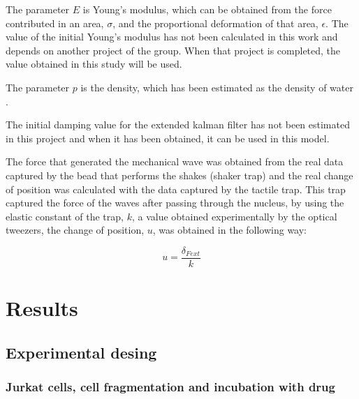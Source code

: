 \documentclass[12pt, a4paper]{article} %
\begin{document}
The parameter $E$ is Young's modulus, which can be obtained from the force contributed in an area, $\sigma$, and the proportional deformation of that area, $\epsilon$. The value of the initial Young's modulus has not been calculated in this work and depends on another project of the group. When that project is completed, the value obtained in this study will be used.

The parameter $p$ is the density, which has been estimated as the density of water \cite{patterson1994measurement}. 

The initial damping value for the extended kalman filter has not been estimated in this project and when it has been obtained, it can be used in this model.

The force that generated the mechanical wave was obtained from the real data captured by the bead that performs the shakes (shaker trap) and the real change of position was calculated with the data captured by the tactile trap. This trap captured the force of the waves after passing through the nucleus, by using the elastic constant of the trap, $k$, a value obtained experimentally by the optical tweezers, the change of position, $u$, was obtained in the following way:

\begin{equation} \label{eqn:real_desp}
	u = \frac{\delta_{Fext}}{k}
\end{equation}

\newpage


\section{Results}

\setlength{\parskip}{0mm}

\subsection{Experimental desing}

\subsubsection{Jurkat cells, cell fragmentation and incubation with drug}
\end{document}
